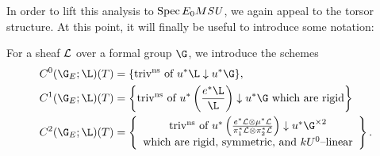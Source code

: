 In order to lift this analysis to \(\operatorname{Spec} E_0 M\mathit{SU}\), we again appeal to the torsor structure.  At this point, it will finally be useful to introduce some notation:
\begin{definition}
For a sheaf \(\mathcal{L}\) over a formal group \(\G\), we introduce the schemes
\begin{align*}
C^0(\G_E; \L)(T) & = \{\text{triv\textsuperscript{ns} of \(u^* \L \downarrow u^* \G\)}\} , \\
C^1(\G_E; \L)(T) & = \left\{\text{triv\textsuperscript{ns} of \(u^* \left( \frac{e^* \L}{\L} \right) \downarrow u^* \G\) which are rigid}\right\} \\
C^2(\G_E; \L)(T) & = \left\{\begin{array}{c}\text{triv\textsuperscript{ns} of \(u^*\left(\frac{e^* \sheaf L \otimes \mu^* \sheaf L}{\pi_1^* \sheaf L \otimes \pi_2^* \sheaf L}\right) \downarrow u^* \G^{\times 2}\)} \\ \text{which are rigid, symmetric, and \(kU^0\)--linear} \end{array}\right\}.
\end{align*}
\end{definition}


